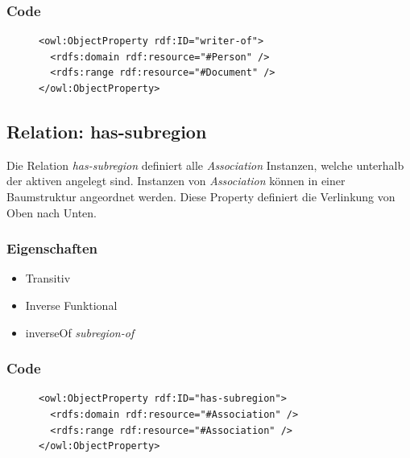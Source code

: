 \documentclass[
    11pt,
    latin1,
    a4paper,
    oneside
]{scrreprt}
\begin{document}
\subsubsection{Code} \label{sec:rel_writerof_code}

\begin{figure}[H]
 \lstset{language=XML}
 \begin{lstlisting}[label=owl:writerof,caption={Die Relation \emph{writer-of} gibt an, welche \emph{Person} an welchem \emph{Document} gearbeitet hat}]
<owl:ObjectProperty rdf:ID="writer-of">
  <rdfs:domain rdf:resource="#Person" />
  <rdfs:range rdf:resource="#Document" />
</owl:ObjectProperty>
 \end{lstlisting}
\end{figure}


\subsection{Relation: has-subregion} \label{sec:rel_hassubregion}

Die Relation \emph{has-subregion} definiert alle \emph{Association} Instanzen, welche unterhalb der aktiven angelegt sind. Instanzen von \emph{Association} k\"onnen in einer Baumstruktur angeordnet werden. Diese Property definiert die Verlinkung von Oben nach Unten.

\subsubsection{Eigenschaften} \label{sec:rel_hassubregion_settings}

\begin{itemize}
  \item Transitiv
  \item Inverse Funktional
  \item inverseOf \emph{subregion-of}
\end{itemize}

\subsubsection{Code} \label{sec:rel_hassubregion_code}

\begin{figure}[H]
 \lstset{language=XML}
 \begin{lstlisting}[label=owl:hassubregion,caption={Die Relation \emph{has-subregion} definiert, welche Untersektionen eine \emph{Association} hat}]
<owl:ObjectProperty rdf:ID="has-subregion">
  <rdfs:domain rdf:resource="#Association" />
  <rdfs:range rdf:resource="#Association" />
</owl:ObjectProperty>
 \end{lstlisting}
\end{figure}
\end{document}
